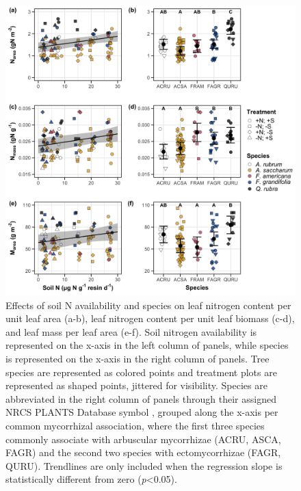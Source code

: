 \newpage
\begin{figure}
    \includegraphics[scale = 0.055]{ch3_NxpH/figs/NxS_fig1_leafn.png}
    \centering
    \caption[Effects of soil nitrogen availability and species on leaf nitrogen content per unit leaf area, leaf nitrogen content per unit leaf biomass, and leaf mass per leaf area]{Effects of soil N availability and species on leaf nitrogen content per unit leaf area (a-b), leaf nitrogen content per unit leaf biomass (c-d), and leaf mass per leaf area (e-f). Soil nitrogen availability is represented on the x-axis in the left column of panels, while species is represented on the x-axis in the right column of panels. Tree species are represented as colored points and treatment plots are represented as shaped points, jittered for visibility. Species are abbreviated in the right column of panels through their assigned NRCS PLANTS Database symbol , grouped along the x-axis per common mycorrhizal association, where the first three species commonly associate with arbuscular mycorrhizae (ACRU, ASCA, FAGR) and the second two species with ectomycorrhizae (FAGR, QURU). Trendlines are only included when the regression slope is statistically different from zero (\textit{p}<0.05).}
    \label{fig:figure3.1}
\end{figure}
\clearpage

